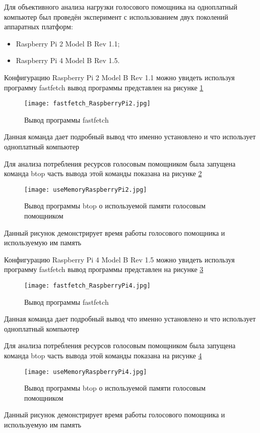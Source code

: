 Для объективного анализа нагрузки голосового помощника на одноплатный компьютер был проведён эксперимент с использованием двух поколений аппаратных платформ:
\begin{itemize}
	\item Raspberry Pi 2 Model B Rev 1.1;
	\item Raspberry Pi 4 Model B Rev 1.5.
\end{itemize}

Конфигурацию Raspberry Pi 2 Model B Rev 1.1 можно увидеть используя программу fastfetch вывод программы представлен на рисунке \ref{fig:fastfetch_RaspberryPi2}

\begin{figure}[H]
	\centering
	\texttt{[image: fastfetch\_RaspberryPi2.jpg]}
	\caption{Вывод программы fastfetch}
	\label{fig:fastfetch_RaspberryPi2}
\end{figure}
Данная команда дает подробный вывод что именно установлено и что использует одноплатный компьютер

Для анализа потребления ресурсов голосовым помощником была запущена команда btop часть вывода этой команды показана на рисунке \ref{fig:useMemoryRaspberryPi2}

\begin{figure}[H]
	\centering
	\texttt{[image: useMemoryRaspberryPi2.jpg]}
	\caption{Вывод программы btop о используемой памяти голосовым помощником}
	\label{fig:useMemoryRaspberryPi2}
\end{figure}
Данный рисунок демонстрирует время работы голосового помощника и используемую им память 

Конфигурацию Raspberry Pi 4 Model B Rev 1.5 можно увидеть используя программу fastfetch вывод программы представлен на рисунке \ref{fig:fastfetch_RaspberryPi4}

\begin{figure}[H]
	\centering
	\texttt{[image: fastfetch\_RaspberryPi4.jpg]}
	\caption{Вывод программы fastfetch}
	\label{fig:fastfetch_RaspberryPi4}
\end{figure}
Данная команда дает подробный вывод что именно установлено и что использует одноплатный компьютер

Для анализа потребления ресурсов голосовым помощником была запущена команда btop часть вывода этой команды показана на рисунке \ref{fig:useMemoryRaspberryPi4}

\begin{figure}[H]
	\centering
	\texttt{[image: useMemoryRaspberryPi4.jpg]}
	\caption{Вывод программы btop о используемой памяти голосовым помощником}
	\label{fig:useMemoryRaspberryPi4}
\end{figure}
Данный рисунок демонстрирует время работы голосового помощника и используемую им память 

